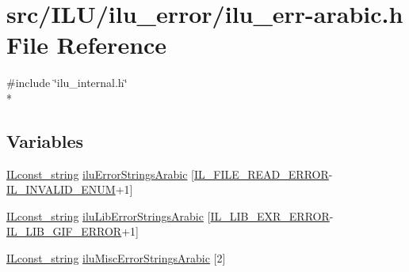 \hypertarget{ilu__err-arabic_8h}{\section{src/\-I\-L\-U/ilu\-\_\-error/ilu\-\_\-err-\/arabic.h File Reference}
\label{ilu__err-arabic_8h}
}
{\ttfamily \#include \char`\"{}ilu\-\_\-internal.\-h\char`\"{}}\\*
\subsection*{Variables}
\begin{DoxyCompactItemize}
\item 
\hyperlink{il_8h_a103ef32cc870d648d471aff6c7076747}{I\-Lconst\-\_\-string} \hyperlink{ilu__err-arabic_8h_aa43b1906aa3e4b3e89e462e2dd63b2a5}{ilu\-Error\-Strings\-Arabic} \mbox{[}\hyperlink{il_8h_ae70fdd3b6e8434371177ed2547b75841}{I\-L\-\_\-\-F\-I\-L\-E\-\_\-\-R\-E\-A\-D\-\_\-\-E\-R\-R\-O\-R}-\/\hyperlink{il_8h_adf311fb99b5d12d7ef3795b0ab3dd918}{I\-L\-\_\-\-I\-N\-V\-A\-L\-I\-D\-\_\-\-E\-N\-U\-M}+1\mbox{]}
\item 
\hyperlink{il_8h_a103ef32cc870d648d471aff6c7076747}{I\-Lconst\-\_\-string} \hyperlink{ilu__err-arabic_8h_af0661ef819c6f24856db2f0e04da356f}{ilu\-Lib\-Error\-Strings\-Arabic} \mbox{[}\hyperlink{il_8h_a4792903188701caaeaa625e49af84a66}{I\-L\-\_\-\-L\-I\-B\-\_\-\-E\-X\-R\-\_\-\-E\-R\-R\-O\-R}-\/\hyperlink{il_8h_ab2d4eb290bfe9e2e5c8d590213034e50}{I\-L\-\_\-\-L\-I\-B\-\_\-\-G\-I\-F\-\_\-\-E\-R\-R\-O\-R}+1\mbox{]}
\item 
\hyperlink{il_8h_a103ef32cc870d648d471aff6c7076747}{I\-Lconst\-\_\-string} \hyperlink{ilu__err-arabic_8h_a77b58f1305188834c5fa93aee6cd92d3}{ilu\-Misc\-Error\-Strings\-Arabic} \mbox{[}2\mbox{]}
\end{DoxyCompactItemize}


